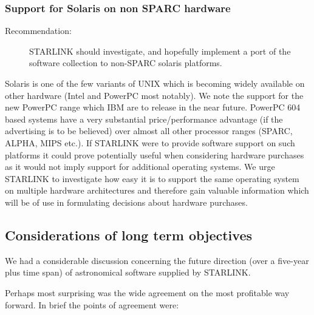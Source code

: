 \subsubsection{Support for Solaris on non SPARC hardware}

\begin{description}
\item[Recommendation:] STARLINK should investigate, and hopefully implement
a port of the software collection to non-SPARC solaris platforms.
\end{description}

Solaris is one of the few variants of UNIX which is becoming widely
available on other hardware (Intel and PowerPC most notably). We note
the support for the new PowerPC range which IBM are to release in the
near future.  PowerPC 604 based systems have a very substantial
price/performance advantage (if the advertising is to be believed)
over almost all other processor ranges (SPARC, ALPHA, MIPS etc.).  If
STARLINK were to provide software support on such platforms it could
prove potentially useful when considering hardware purchases as it
would not imply support for additional operating systems.  We urge
STARLINK to investigate how easy it is to support the same operating
system on multiple hardware architectures and therefore gain valuable
information which will be of use in formulating decisions about
hardware purchases.

\subsection{Considerations of long term objectives}

We had a considerable discussion concerning the future direction (over
a five-year plus time span) of astronomical software supplied by
STARLINK.

Perhaps most surprising was the wide agreement on the most profitable
way forward. In brief the points of agreement were:

